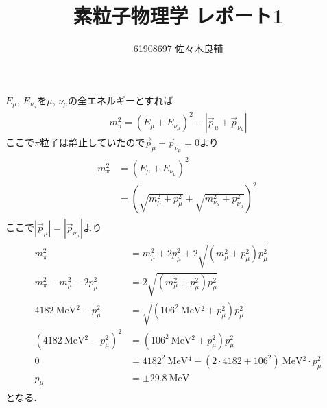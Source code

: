 \documentclass[uplatex,a4j,11pt,dvipdfmx]{jsarticle}
\begin{document}
\title{素粒子物理学 レポート1}
\author{61908697 佐々木良輔}
\date{}
\maketitle
$E_\mu$, $E_{\nu_\mu}$を$\mu$, $\nu_\mu$の全エネルギーとすれば
\begin{align}
  m_\pi^2=(E_\mu+E_{\nu_\mu})^2-|\vec{p}_\mu+\vec{p}_{\nu_\mu}|
\end{align}
ここで$\pi$粒子は静止していたので$\vec{p}_\mu+\vec{p}_{\nu_\mu}=0$より
\begin{align}
  \begin{split}
    m_\pi^2&=(E_\mu+E_{\nu_\mu})^2\\
    &=\left(\sqrt{m_\mu^2+p_\mu^2}+\sqrt{m_{\nu_\mu}^2+p_{\nu_\mu}^2}\right)^2\
  \end{split}
\end{align}
ここで$|\vec{p}_{\mu}|=|\vec{p}_{\nu_\mu}|$より
\begin{align}
  \begin{split}
    m_\pi^2&=m_\mu^2+2p_\mu^2+2\sqrt{\left(m_\mu^2+p_\mu^2\right)p_\mu^2}\\
    m_\pi^2-m_\mu^2-2p_\mu^2&=2\sqrt{\left(m_\mu^2+p_\mu^2\right)p_\mu^2}\\
    4182\ \si{\mega\electronvolt^2}-p_\mu^2&=\sqrt{(106^2\ \si{\mega\electronvolt^2}+p_\mu^2)p_\mu^2}\\
    \left(4182\ \si{\mega\electronvolt^2}-p_\mu^2\right)^2&=(106^2\ \si{\mega\electronvolt^2}+p_\mu^2)p_\mu^2\\
    0&=4182^2\ \si{\mega\electronvolt^4}-(2\cdot4182+106^2)\ \si{\mega\electronvolt^2}\cdot p_\mu^2\\
    p_\mu&=\pm 29.8\ \si{\mega\electronvolt}
  \end{split}
\end{align}
となる.
\end{document}
